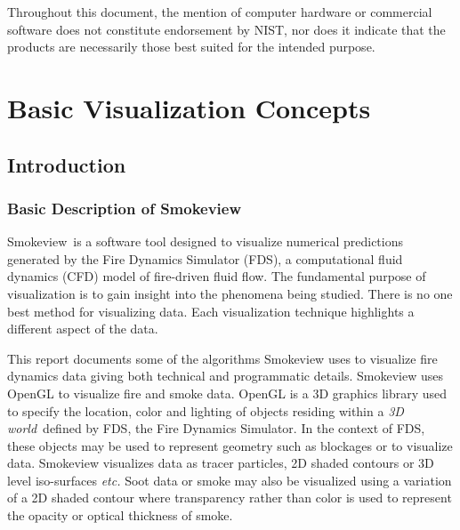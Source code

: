 \documentclass[11pt,twoside]{book}
\newcommand{\fds}{{FDS}}
\newcommand{\Smokeview}{{Smokeview}}
\begin{document}
Throughout this document, the mention of computer hardware or
commercial software does not constitute endorsement by NIST,
nor does
it indicate that the products are necessarily those
best suited for the
intended purpose.

%
%



\tableofcontents
\listoffigures

\mainmatter


%
%

\part{Basic Visualization Concepts}

%
%

\chapter{Introduction}
\section{Basic Description of Smokeview}
\Smokeview\ is a software tool designed to visualize numerical
predictions generated by the Fire Dynamics Simulator (\fds),
a computational fluid dynamics (CFD) model of fire-driven fluid
flow\cite{FDS_Tech_Guide_5}.  The fundamental purpose of visualization is to gain
insight into the phenomena being studied.  There is no one best method for visualizing data.
Each visualization technique highlights a different aspect of the data.

This report documents some of the algorithms Smokeview uses to visualize fire dynamics data giving both technical and programmatic details.
Smokeview uses OpenGL to visualize fire and smoke data.  OpenGL
is a 3D graphics library used to specify the location, color and
lighting of objects residing within a {\em 3D world}\ defined by FDS,
the Fire Dynamics Simulator. In the context of FDS, these objects
may be used to represent geometry such as blockages or to
visualize data. Smokeview visualizes data as tracer particles, 2D
shaded contours or 3D level iso-surfaces {\em etc.}  Soot data or
smoke may also be visualized using a variation of a 2D shaded
contour where transparency rather than color is used to represent
the opacity or optical thickness of smoke.
\end{document}
